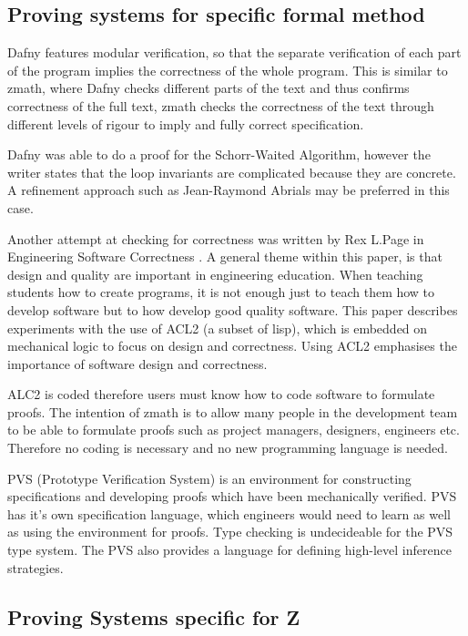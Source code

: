 \subsection{Proving systems for specific formal method}


Dafny \cite{dafny} features modular verification, so that the separate verification of each part of the program implies the correctness of the whole program. This is similar to \gls{zmath}, where Dafny checks different parts of the text and thus confirms correctness of the full text, \gls{zmath} checks the correctness of the text through different levels of rigour to imply and fully correct specification.

Dafny was able to do a proof for the Schorr-Waited Algorithm, however the writer states that the loop invariants are complicated because they are concrete. A refinement approach such as Jean-Raymond Abrials \cite{abrial} may be preferred in this case.  

Another attempt at checking for correctness was written by Rex L.Page in Engineering Software Correctness \cite{engineeringsoftwarecorrectness}. A general theme within this paper, is that design and quality are important in engineering education. When teaching students how to create programs, it is not enough just to teach them how to develop software but to how develop good quality software. This paper describes experiments with the use of ACL2 (a subset of lisp), which is embedded on mechanical logic to focus on design and correctness. Using ACL2 emphasises the importance of software design and correctness. 

ALC2 is coded therefore users must know how to code software to formulate proofs. The intention of \gls{zmath} is to allow many people in the development team to be able to formulate proofs such as project managers, designers, engineers etc. Therefore no coding is necessary and no new programming language is needed.

PVS (Prototype Verification System) \cite{pvs} is an environment for constructing specifications and developing proofs which have been mechanically verified. PVS has it's own specification language, which engineers would need to learn as well as using the environment for proofs. Type checking is undecideable for the PVS type system. The PVS also provides a language for defining high-level inference strategies.


\subsection{Proving Systems specific for Z}
\label{subsec:provingSystemsForZ}


